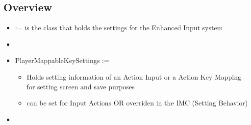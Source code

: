     \subsection{Overview}
        \begin{itemize}
            \item {} := is the class that holds the settings for the Enhanced Input system
            \item 
            \item PlayerMappableKeySettings :=
            \begin{itemize}
                \item Holds setting information of an Action Input or a Action Key Mapping for setting screen and save purposes
                \item can be set for Input Actions OR overriden in the IMC (Setting Behavior)
            \end{itemize} 
        \end{itemize}
    
        



    \begin{itemize}
        \item 
    \end{itemize}

\newpage
